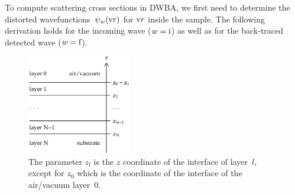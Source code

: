 To compute scattering cross sections in DWBA,
we first need to determine the distorted wavefunctions~$\psi_w(\text{v}{r})$
for $\text{v}{r}$ inside the sample.
The following derivation holds for the incoming wave ($w=\text{i}$)
as well as for the back-traced detected wave ($w=\text{f}$).

\begin{figure}[tb]
\begin{center}
\includegraphics[width=0.4\textwidth]{fig/drawing/multilayer_z_conventions.ps}
\end{center}
\caption{The parameter $z_l$ is the $z$ coordinate of the  interface
%
%
%
%
of layer~$l$, except for $z_0$ which is the coordinate of the  interface
of the air/vacuum layer~0.}
\label{Fdefz}
\end{figure}

